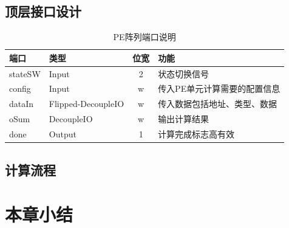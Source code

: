     \subsection{顶层接口设计}
\begin{table}[h] %
    \centering
    \caption{PE阵列端口说明} %
    \begin{tabular}{l|l|c|l} %
    \hline  
    \hline  
    端口 & 类型 & 位宽 & 功能 \\ %
    \hline %
    stateSW & Input & 2 & 状态切换信号 \\
    \hline  
    config & Input & w & 传入PE单元计算需要的配置信息 \\
    \hline  
    dataIn & Flipped-DecoupleIO & w & 传入数据包括地址、类型、数据 \\
    \hline  
    oSum & DecoupleIO & w & 输出计算结果 \\
    \hline  
    done & Output & 1 & 计算完成标志高有效 \\
    \hline  
    \hline  
    \end{tabular}  
\end{table}  
    \subsection{计算流程}

\section{本章小结}





